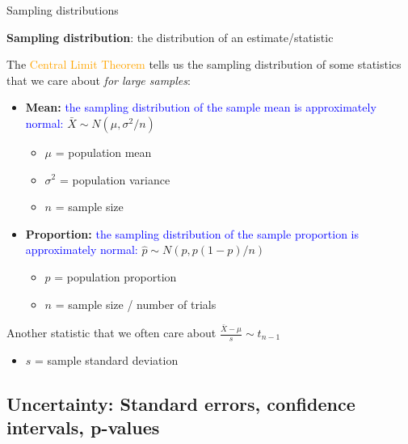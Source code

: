\documentclass[10pt,t]{beamer}
\begin{document}
\begin{frame}{Sampling distributions}

\textbf{Sampling distribution}: the distribution of an estimate/statistic

\vspace{0.3cm}

The \textcolor{orange}{Central Limit Theorem} tells us the sampling distribution of some statistics that we care about \textit{for large samples}:

\begin{itemize}
	\item \textbf{Mean:} \textcolor{blue}{the sampling distribution of the sample mean is approximately normal:} $\bar{X} \sim N(\mu, \sigma^2 / n)$
	\begin{itemize}
		\item $\mu$ = population mean
		\item $\sigma^2$ = population variance
		\item $n$ = sample size
	\end{itemize}
	\item \textbf{Proportion:} \textcolor{blue}{the sampling distribution of the sample proportion is approximately normal:} $ \hat{p} \sim N(p, p(1-p)/n)$
	\begin{itemize}
		\item $p$ = population proportion
		\item $n$ = sample size / number of trials
	\end{itemize}
\end{itemize}
Another statistic that we often care about $\frac{\bar{X} - \mu}{s} \sim t_{n - 1}$
\begin{itemize}
	\item $s$ = sample standard deviation
\end{itemize}

\end{frame}

\subsection{Uncertainty: Standard errors, confidence intervals, p-values}
\end{document}
